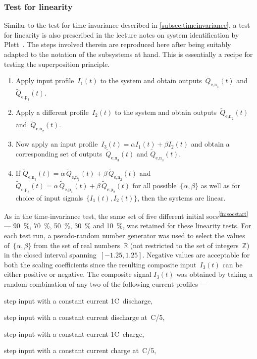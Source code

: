 \subsubsection*{Test for linearity}
Similar     to      the     test      for     time      invariance     described
in \cref{subsec:timeinvariance}, a  test for linearity is  also prescribed in
the lecture notes on  system identification by Plett~\cite{PlettECE5560_02}. The
steps involved therein  are reproduced here after being suitably  adapted to the
notation of the subsystems at hand. This is essentially a recipe for testing the
superposition principle.
\begin{enumerate}
    \item Apply input profile~$I_1(t)$ to the system and obtain outputs~$\widetilde{Q}_{\text{e,n}_1}\!(t)$ and~$\widetilde{Q}_{\text{e,p}_1}\!(t)$.
    \item Apply a different profile~$I_2(t)$ to the system and obtain outputs~$\widetilde{Q}_{\text{e,n}_2}\!(t)$ and~$\widetilde{Q}_{\text{e,n}_2}\!(t)$.
    \item Now apply an input profile~$I_3(t) = \alpha I_1(t) + \beta I_2(t)$ and obtain a corresponding set of outputs~$\widetilde{Q}_{\text{e,n}_3}\!(t)$ and $\widetilde{Q}_{\text{e,n}_3}\!(t)$.
    \item If ${\widetilde{Q}_{\text{e,n}_3}\!(t) = \alpha\,
            \widetilde{Q}_{\text{e,n}_1}\!(t) + \beta \,
            \widetilde{Q}_{\text{e,n}_2}\!(t)}$ and
            ${\widetilde{Q}_{\text{e,p}_3}\!(t) = \alpha\,
                \widetilde{Q}_{\text{e,p}_1}\!(t) + \beta \,
            \widetilde{Q}_{\text{e,p}_2}\!(t)}$ for all possible~$\{\alpha,\beta\}$ as well as for choice of input signals~$\{I_1(t),I_2(t)\}$, then the systems are linear.
\end{enumerate}

As   in   the  time-invariance   test,   the   same   set  of   five   different
initial  \glspl{soc}\textsuperscript{\ref{fn:socstart}}  ---  \SI{90}{\percent},
\SI{70}{\percent},  \SI{50}{\percent}, \SI{30}{\percent}  and \SI{10}{\percent},
was  retained for  these linearity  tests. For  each test  run, a  pseudo-random
number generator  was used to select  the values of~$\{\alpha,\beta\}$  from the
set  of  real numbers~$\mathbb{R}$  (not  restricted  to  the set  of  integers~$\mathbb{Z}$) in  the closed  interval spanning~$[-1.25,1.25]$.  Negative values
are acceptable for  both the scaling coefficients since  the resulting composite
input~$I_3(t)$ can be either positive or negative. The composite signal $I_3(t)$
was obtained by taking a random combination  of any two of the following current
profiles ---
\begin{enumerate*}[label=\emph{\alph*})]
    \item step input with a constant current 1C~discharge,
    \item step input with a constant current discharge at~C/5,
    \item step input with a constant current 1C~charge,
    \item step input with a constant current charge at~C/5,
\end{enumerate*}

